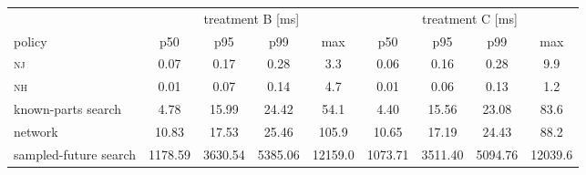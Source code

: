 \begin{tabular}{@{}lcccc|cccc@{}}
\toprule
 & \multicolumn{4}{c|}{treatment B [ms]} & \multicolumn{4}{c}{treatment C [ms]} \\
policy & p50 & p95 & p99 & max & p50 & p95 & p99 & max \\
\midrule
\textsc{nj} & 0.07 & 0.17 & 0.28 & 3.3 & 0.06 & 0.16 & 0.28 & 9.9 \\
\textsc{nh} & 0.01 & 0.07 & 0.14 & 4.7 & 0.01 & 0.06 & 0.13 & 1.2 \\
known-parts search & 4.78 & 15.99 & 24.42 & 54.1 & 4.40 & 15.56 & 23.08 & 83.6 \\
network & 10.83 & 17.53 & 25.46 & 105.9 & 10.65 & 17.19 & 24.43 & 88.2 \\
sampled-future search & 1178.59 & 3630.54 & 5385.06 & 12159.0 & 1073.71 & 3511.40 & 5094.76 & 12039.6 \\
\bottomrule
\end{tabular}
